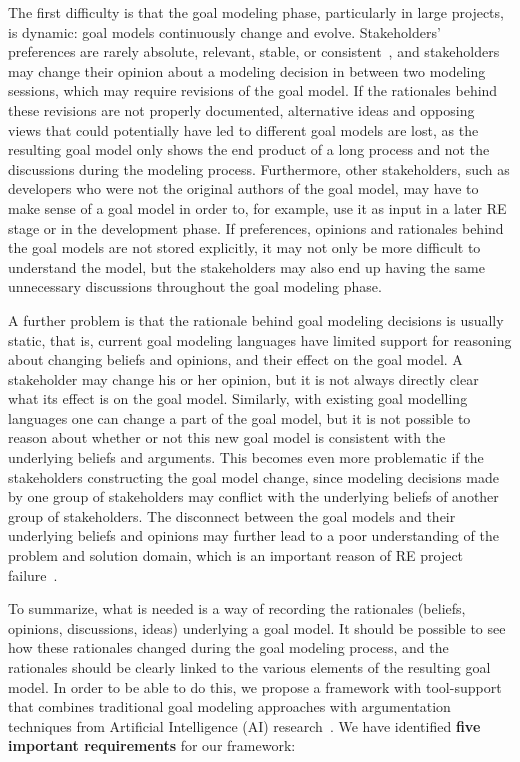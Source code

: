 
The first difficulty is that the goal modeling phase, particularly in large projects, is dynamic: goal models continuously change and evolve. Stakeholders' preferences are rarely absolute, relevant, stable, or consistent~\cite{march1978bounded}, and stakeholders may change their opinion about a modeling decision in between two modeling sessions, which may require revisions of the goal model. If the rationales behind these revisions are not properly documented, alternative ideas and opposing views that could potentially have led to different goal models are lost, as the resulting goal model only shows the end product of a long process and not the discussions during the modeling process. Furthermore, other stakeholders, such as developers who were not the original authors of the goal model, may have to make sense of a goal model in order to, for example, use it as input in a later RE stage or in the development phase. If preferences, opinions and rationales behind the goal models are not stored explicitly, it may not only be more difficult to understand the model, but the stakeholders may also end up having the same unnecessary discussions throughout the goal modeling phase.

A further problem is that the rationale behind goal modeling decisions is usually static, that is, current goal modeling languages have limited support for reasoning about changing beliefs and opinions, and their effect on the goal model. A stakeholder may change his or her opinion, but it is not always directly clear what its effect is on the goal model. Similarly, with existing goal modelling languages one can change a part of the goal model, but it is not possible to reason about whether or not this new goal model is consistent with the underlying beliefs and arguments. This becomes even more problematic if the stakeholders constructing the goal model change, since modeling decisions made by one group of stakeholders may conflict with the underlying beliefs of another group of stakeholders. The disconnect between the goal models and their underlying beliefs and opinions may further lead to a poor understanding of the problem and solution domain, which is an important reason of RE project failure~\cite{curtis1988field}. 

To summarize, what is needed is a way of recording the rationales (beliefs, opinions, discussions, ideas) underlying a goal model. It should be possible to see how these rationales changed during the goal modeling process, and the rationales should be clearly linked to the various elements of the resulting goal model. In order to be able to do this, we propose a framework with tool-support that combines traditional goal modeling approaches with argumentation techniques from Artificial Intelligence (AI) research~\cite{BenchCaponDunne2007}. We have identified \textbf{five important requirements} for our framework: 

